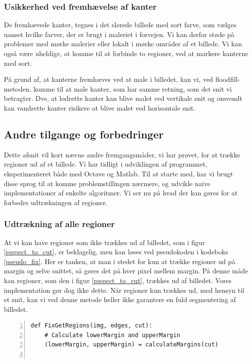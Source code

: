 {\subsubsection{Usikkerhed ved fremhævelse af kanter}
De fremhævede kanter, tegnes i det slørede billede med sort farve, som
vælges uanset hvilke farver, der er brugt i maleriet i forvejen. Vi kan
derfor støde på problemer med mørke malerier eller lokalt i mørke
områder af et billede. Vi kan også være uheldige, at komme til at
forbinde to regioner, ved at markere kanterne med sort.

På grund af, at kanterne fremhæves ved at male i billedet, kan vi, ved
floodfill-metoden, komme til at male kanter, som har samme retning, som
det snit vi betragter. Dvs, at lodrette kanter kan blive malet ved
vertikale snit og omvendt kan vandrette kanter risikere at blive malet
ved horisontale snit.

\subsection{Andre tilgange og forbedringer}
Dette afsnit vil kort nævne andre fremgangsmåder, vi har prøvet, for at
trække regioner ud af et billede. Vi har tidligt i udviklingen af
programmet, eksperimenteret både med Octave og Matlab. Til at starte
med, har vi brugt disse sprog til at komme problemstillingen nærmere,
og udvikle naive implementationer af enkelte algoritmer. Vi ser nu på
hvad der kan gøres for at forbedre udtrækningen af regioner.

\subsubsection{Udtrækning af alle regioner}
At vi kan have regioner som ikke trækkes ud af billedet, som i figur
\ref{respect_to_cut}, er beklagelig, men kan løses ved pseudokoden i
kodeboks \ref{pseudo_fix}.  Her er tanken, at man i stedet for kun at
trække regioner ud på margin og selve snittet, så gøres det på hver
pixel mellem margin. På denne måde kan regioner, som den i figur
\ref{respect_to_cut}, trækkes ud af billedet. Vores implementation gør
dog ikke dette. Når regioner kun trækkes ud, med hensyn til et snit, kan
vi ved denne metode heller ikke garantere en fuld segmentering af
billedet.

\begin{lstlisting}[caption={Pseudokode til udtrækning af regioner med
    margin.},captionpos=b,label={pseudo_fix},numbers=left,
    frame=tb, breaklines=false, float=h]
def FixGetRegions(img, edges, cut):
    # Calculate lowerMargin and upperMargin
    (lowerMargin, upperMargin) = calculateMargins(cut)


\end{lstlisting}}
